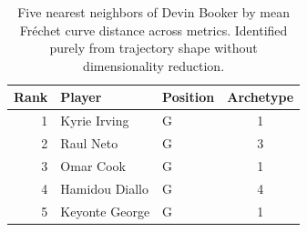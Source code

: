 \begin{table}[htbp]
  \centering\small
  \begin{tabular}{rllc}
    \toprule
    Rank & Player & Position & Archetype \\
    \midrule
    1 & Kyrie Irving & G & 1 \\
    2 & Raul Neto & G & 3 \\
    3 & Omar Cook & G & 1 \\
    4 & Hamidou Diallo & G & 4 \\
    5 & Keyonte George & G & 1 \\
    \bottomrule
  \end{tabular}
  \caption{Five nearest neighbors of Devin Booker by mean Fr\'{e}chet curve distance across metrics. Identified purely from trajectory shape without dimensionality reduction.}
  \label{tab:Devin_Booker_frechet_curve_neighbors}
\end{table}

